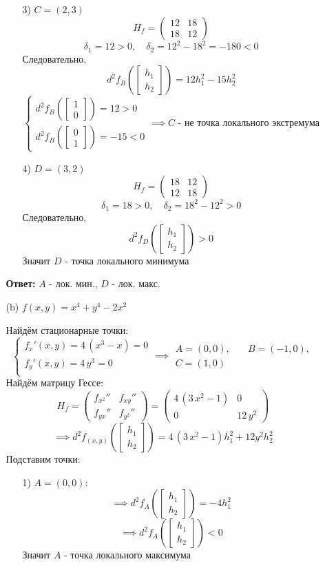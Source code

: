 \documentclass[a4paper]{article}
\newcommand{\mat}[1]{\begin{pmatrix} #1 \end{pmatrix}}
\newcommand{\matsq}[1]{\begin{bmatrix} #1 \end{bmatrix}}
\newcommand{\case}[1]{\begin{cases} #1 \end{cases}}
\begin{document}
\begin{enumerate}
\begin{enumerate}
\begin{enumerate}
            \item[3)] $C = (2, 3)$
            $$H_f = \mat{
                12 & 18\\
                18 & 12
            }$$
            $$\delta_1 = 12 > 0, \quad \delta_2  = 12^2-18^2 = -180< 0$$
            Следовательно, 
            $$d^2f_{B}\left(\matsq{h_1\\h_2}\right) = 12h_1^2-15h_2^2$$
            $$\case{
                d^2f_{B}\left(\matsq{1\\0}\right) = 12 > 0\\
                d^2f_{B}\left(\matsq{0\\1}\right) = -15 < 0
            } \implies C \text{ - не точка локального экстремума}$$
    
            \item[4)] $D = (3, 2)$
            $$H_f = \mat{
            18 & 12\\
            12 & 18}$$
            $$\delta_1 = 18 > 0, \quad \delta_2  = 18^2-12^2 > 0$$
            Следовательно, 
            $$d^2f_{D}\left(\matsq{h_1\\h_2}\right) > 0$$
            Значит $D$ - точка локального минимума       
            
        \end{enumerate}
        \textbf{Ответ: } $A$ - лок. мин., $D$ - лок. макс.\\

        \item[(b)] $f(x, y) = x^4 + y^4 - 2x^2$
        
        Найдём стационарные точки:
        $$\case{
            f_x'(x, y) =4\,\left({x}^{3}-x\right) =0\\
            f_y'(x, y) = 4\,{y}^{3}=0\\
        }\implies \begin{aligned}
            A = (0, 0), &\quad B= (-1, 0),\\
            C = (1, 0) 
        \end{aligned}$$
        Найдём матрицу Гессе:
        $$H_f = \mat{
            f_{x^2}'' & f_{xy}''\\
            f_{yx}'' & f_{y^2}''
        } = \mat{
            4\,\left(3\,{x}^{2}-1\right) & 0\\
            0 & 12\,{y}^{2}
        } $$
        $$\implies d^2f_{(x, y)}\left(\matsq{h_1\\h_2}\right) = 4\,\left(3\,{x}^{2}-1\right)h_1^2+12y^2h_2^2$$
        Подставим точки:
        \begin{enumerate}
            \item[1)]$A = (0, 0)$:
            $$\implies d^2f_{A}\left(\matsq{h_1\\h_2}\right)
             = -4h_1^2$$
             $$\implies d^2f_{A}\left(\matsq{h_1\\h_2}\right)<0$$
            Значит $A$ - точка локального максимума


\end{enumerate}
\end{enumerate}
\end{enumerate}
\end{document}
